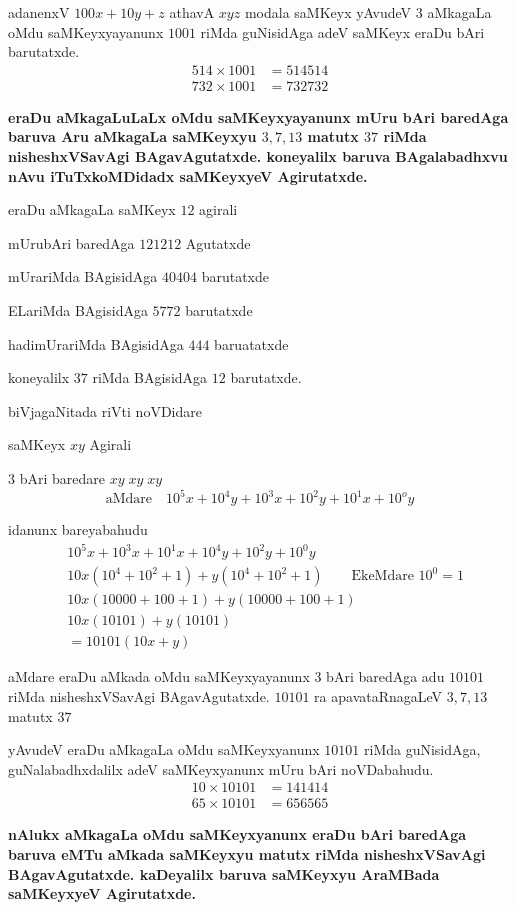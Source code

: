adanenxV $100x+10y+z$ athavA $xyz$ modala saMKeyx yAvudeV $3$ aMkagaLa oMdu saMKeyxyayanunx $1001$ riMda guNisidAga adeV saMKeyx eraDu bAri barutatxde.
\begin{align*}
514\times 1001 &= 514514\\
732\times 1001 &= 732732
\end{align*}

{\bf eraDu aMkagaLuLaLx oMdu saMKeyxyayanunx mUru bAri baredAga baruva Aru aMkagaLa saMKeyxyu $3,7,13$ matutx $37$ riMda nisheshxVSavAgi BAgavAgutatxde. koneyalilx baruva BAgalabadhxvu nAvu iTuTxkoMDidadx saMKeyxyeV Agirutatxde.}

eraDu aMkagaLa saMKeyx $12$ agirali

mUrubAri baredAga $121212$ Agutatxde

mUrariMda BAgisidAga $40404$ barutatxde

ELariMda BAgisidAga $5772$ barutatxde

hadimUrariMda BAgisidAga $444$ baruatatxde

koneyalilx $37$ riMda BAgisidAga $12$ barutatxde.

biVjagaNitada riVti noVDidare

saMKeyx $xy$ Agirali

$3$ bAri baredare $xy\;xy\;xy$
$$
\text{aMdare}\quad 10^{5}x+10^{4}y+10^{3}x+10^{2}y+10^{1}x+10^{o}y 
$$

idanunx bareyabahudu
\begin{align*}
&10^{5}x+10^{3}x+10^{1}x +10^{4}y+10^{2}y+10^{0}y\\
&10x\left(10^4 +10^2+1\right) +y\left(10^4+10^2+1\right)\qquad \text{EkeMdare $10^0 = 1$}\\
&10x(10000+100+1) + y (10000+100+1)\\
&10x(10101) + y(10101)\\
&=10101 (10x+y)
\end{align*}

aMdare eraDu aMkada oMdu saMKeyxyayanunx $3$ bAri baredAga adu $10101$ riMda nisheshxVSavAgi BAgavAgutatxde. $10101$ ra apavataRnagaLeV $3,7,13$ matutx $37$

yAvudeV eraDu aMkagaLa oMdu saMKeyxyanunx $10101$ riMda guNisidAga, guNalabadhxdalilx adeV saMKeyxyanunx mUru bAri noVDabahudu.
\begin{align*}
10\times 10101 &= 141414\\
65\times 10101 &= 656565
 \end{align*} 

{\bf nAlukx aMkagaLa oMdu saMKeyxyanunx eraDu bAri baredAga {} baruva eMTu aMkada saMKeyxyu {} matutx {} riMda nisheshxVSavAgi BAgavAgutatxde. kaDeyalilx baruva saMKeyxyu AraMBada saMKeyxyeV Agirutatxde.}

